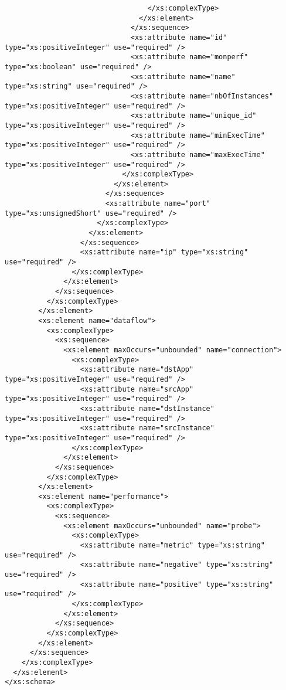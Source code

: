 \begin{verbatim}
                                  </xs:complexType>
                                </xs:element>
                              </xs:sequence>
                              <xs:attribute name="id" type="xs:positiveInteger" use="required" />
                              <xs:attribute name="monperf" type="xs:boolean" use="required" />
                              <xs:attribute name="name" type="xs:string" use="required" />
                              <xs:attribute name="nbOfInstances" type="xs:positiveInteger" use="required" />
                              <xs:attribute name="unique_id" type="xs:positiveInteger" use="required" />
                              <xs:attribute name="minExecTime" type="xs:positiveInteger" use="required" />
                              <xs:attribute name="maxExecTime" type="xs:positiveInteger" use="required" />
                            </xs:complexType>
                          </xs:element>
                        </xs:sequence>
                        <xs:attribute name="port" type="xs:unsignedShort" use="required" />
                      </xs:complexType>
                    </xs:element>
                  </xs:sequence>
                  <xs:attribute name="ip" type="xs:string" use="required" />
                </xs:complexType>
              </xs:element>
            </xs:sequence>
          </xs:complexType>
        </xs:element>
        <xs:element name="dataflow">
          <xs:complexType>
            <xs:sequence>
              <xs:element maxOccurs="unbounded" name="connection">
                <xs:complexType>
                  <xs:attribute name="dstApp" type="xs:positiveInteger" use="required" />
                  <xs:attribute name="srcApp" type="xs:positiveInteger" use="required" />
                  <xs:attribute name="dstInstance" type="xs:positiveInteger" use="required" />
                  <xs:attribute name="srcInstance" type="xs:positiveInteger" use="required" />                  
                </xs:complexType>
              </xs:element>
            </xs:sequence>
          </xs:complexType>
        </xs:element>
        <xs:element name="performance">
          <xs:complexType>
            <xs:sequence>
              <xs:element maxOccurs="unbounded" name="probe">
                <xs:complexType>
                  <xs:attribute name="metric" type="xs:string" use="required" />
                  <xs:attribute name="negative" type="xs:string" use="required" />
                  <xs:attribute name="positive" type="xs:string" use="required" />
                </xs:complexType>
              </xs:element>
            </xs:sequence>
          </xs:complexType>
        </xs:element>        
      </xs:sequence>
    </xs:complexType>
  </xs:element>
</xs:schema>
\end{verbatim}
